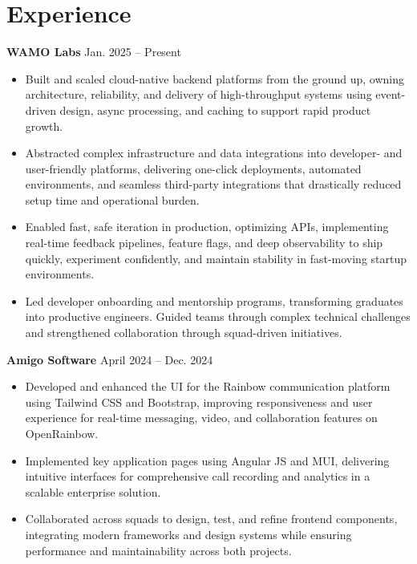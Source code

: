 \documentclass[a4paper,10pt]{article}
\begin{document}
\section*{Experience}
\vspace{0.2cm}

\textbf{WAMO Labs} \hfill Jan. 2025 -- Present

\vspace{0.2cm}

\begin{itemize}
    \item Built and scaled cloud-native backend platforms from the ground up, owning architecture, reliability, and delivery of high-throughput systems using event-driven design, async processing, and caching to support rapid product growth.
    \item Abstracted complex infrastructure and data integrations into developer- and user-friendly platforms, delivering one-click deployments, automated environments, and seamless third-party integrations that drastically reduced setup time and operational burden.
    \item Enabled fast, safe iteration in production, optimizing APIs, implementing real-time feedback pipelines, feature flags, and deep observability to ship quickly, experiment confidently, and maintain stability in fast-moving startup environments.
    \item Led developer onboarding and mentorship programs, transforming graduates into productive engineers. Guided teams through complex technical challenges and strengthened collaboration through squad-driven initiatives.
\end{itemize}

\vspace{0.2cm}

\textbf{Amigo Software} \hfill April 2024 -- Dec. 2024

\vspace{0.2cm}

\begin{itemize}
    \item Developed and enhanced the UI for the Rainbow communication platform using Tailwind CSS and Bootstrap, improving responsiveness and user experience for real-time messaging, video, and collaboration features on OpenRainbow.
    \item Implemented key application pages using Angular JS and MUI, delivering intuitive interfaces for comprehensive call recording and analytics in a scalable enterprise solution.
    \item Collaborated across squads to design, test, and refine frontend components, integrating modern frameworks and design systems while ensuring performance and maintainability across both projects.
\end{itemize}
\end{document}
